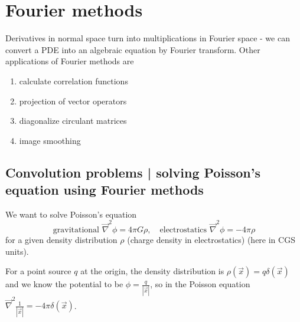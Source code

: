 \section{Fourier methods}
\thispagestyle{plain}

Derivatives in normal space turn into multiplications in Fourier space - we can convert
a PDE into an algebraic equation by Fourier transform. Other applications of Fourier
methods are

\begin{enumerate}
    \item calculate correlation functions
    \item projection of vector operators
    \item diagonalize circulant matrices
    \item image smoothing
\end{enumerate}

\subsection{Convolution problems | solving Poisson's equation using Fourier methods}
We want to solve Poisson's equation
\begin{equation}
    \text{gravitational } \vec{\nabla}^2 \phi = 4\pi G\rho, \quad \text{electrostatics } \vec{\nabla}^2 \phi = - 4 \pi \rho
\end{equation}
for a given density distribution $\rho$ (charge density in electrostatics) (here in CGS units).


For a point source $q$ at the origin, the density distribution is $\rho(\vec{x}) = q \delta(\vec{x})$ and we know the
potential to be $\phi = \frac{q}{|\vec{x}|}$, so in the Poisson equation $\vec{\nabla}^2 \frac{1}{|\vec{x}|} = -4\pi \delta (\vec{x})$.

